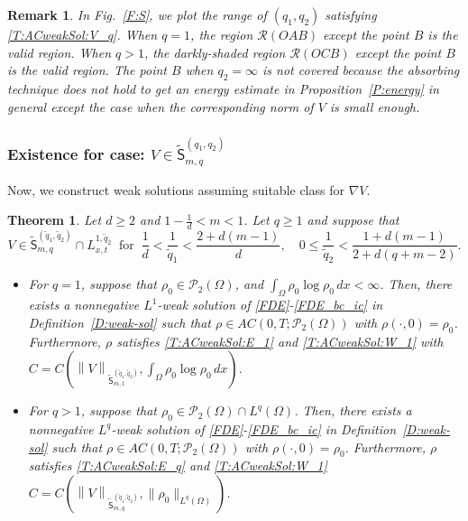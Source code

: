 \documentclass{amsart}
\newtheorem{theorem}[defn]{Theorem}
\newtheorem{remark}[defn]{Remark}
\numberwithin{equation}{section}
\begin{document}
\begin{remark}\label{R:1}
	In Fig.~\ref{F:S}, we plot the range of $(q_1,q_2)$ satisfying \eqref{T:ACweakSol:V_q}. When $q=1$, the region $\mathcal{R}(OAB)$ except the point $B$ is the valid region. When $q>1$, the darkly-shaded region $\mathcal{R}(OCB)$ except the point $B$ is the valid region. The point $B$ when $q_2 = \infty$ is not covered because the absorbing technique does not hold to get an energy estimate in Proposition~\ref{P:energy} in general except the case when the corresponding norm of $V$ is small enough. 
\end{remark}

\subsubsection{Existence for case: $V \in \tilde{\mathsf{S}}_{m,q}^{(q_1,q_2)}$ }\label{SS:tilde Serrin}

Now, we construct weak solutions assuming suitable class for $\nabla V$. 

\begin{theorem}\label{T:ACweakSol_tilde}
Let $d\geq 2$ and $ 1-\frac{1}{d} < m <1$. Let $q\geq 1$ and suppose that 
 \begin{equation}\label{T:ACweakSol_tilde:V_q}
V\in \tilde{\mathsf{S}}_{m,q}^{(\tilde{q}_1, \tilde{q}_2)}\cap L_{x,t}^{1,\tilde{q}_2}    \ \text{ for }  \ 
\frac{1}{d} < \frac{1}{\tilde{q}_1} < \frac{2+d(m-1)}{d}, \quad  0\leq \frac{1}{\tilde{q}_2} < \frac{1+d(m-1)}{2+d(q+m-2)}.
\end{equation}

\begin{itemize}
	\item[(i)]  For $q=1$, suppose that $\rho_0 \in  \mathcal{P}_2(\Omega)$, and $\int_{\Omega} \rho_0 \log \rho_0 \,dx < \infty$. 
Then, there exists a nonnegative $L^1$-weak solution of \eqref{FDE}-\eqref{FDE_bc_ic} in Definition~\ref{D:weak-sol} such that  $\rho \in AC(0,T; \mathcal{P}_2 (\Omega))$ with $\rho(\cdot, 0)=\rho_0$.
Furthermore, $\rho$ satisfies 
\eqref{T:ACweakSol:E_1} and \eqref{T:ACweakSol:W_1} with $C=C
 (\left\| V\right\|_{\tilde{\mathsf{S}}_{m,1}^{(\tilde{q}_1,
\tilde{q}_2)}}, \int_{\Omega} \rho_0 \log \rho_0 \,dx )$.
\smallskip 

   \item[(ii)] For $q>1$, suppose that $\rho_0 \in  \mathcal{P}_2(\Omega) \cap L^{q}(\Omega)$. 
Then, there exists a nonnegative $L^q$-weak solution of \eqref{FDE}-\eqref{FDE_bc_ic} in Definition~\ref{D:weak-sol} such that  $\rho \in AC(0,T; \mathcal{P}_2 (\Omega))$ with $\rho(\cdot, 0)=\rho_0$.
Furthermore, $\rho$ satisfies \eqref{T:ACweakSol:E_q} and \eqref{T:ACweakSol:W_1} 
$C = C (\left\| V\right\|_{\tilde{\mathsf{S}}_{m,q}^{(\tilde{q}_1, \tilde{q}_2)}}, \|\rho_0\|_{L^{q}(\Omega)} )$.
\end{itemize}
\end{theorem}
\end{document}
